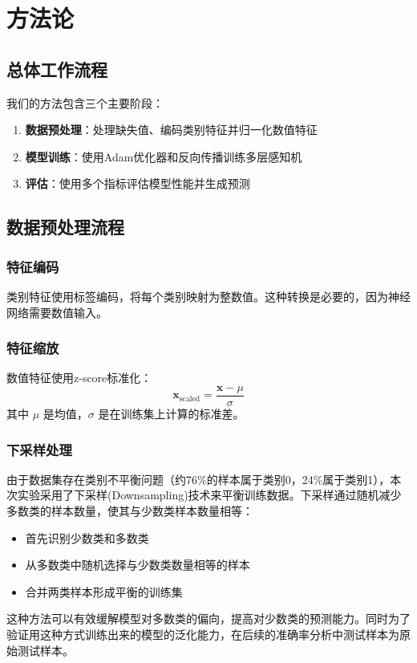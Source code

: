 \documentclass[conference]{IEEEtran}
\begin{document}
\section{方法论}

\subsection{总体工作流程}
我们的方法包含三个主要阶段：
\begin{enumerate}
    \item \textbf{数据预处理}：处理缺失值、编码类别特征并归一化数值特征
    \item \textbf{模型训练}：使用Adam优化器和反向传播训练多层感知机
    \item \textbf{评估}：使用多个指标评估模型性能并生成预测
\end{enumerate}

\subsection{数据预处理流程}

\subsubsection{特征编码}
类别特征使用标签编码，将每个类别映射为整数值。这种转换是必要的，因为神经网络需要数值输入。

\subsubsection{特征缩放}
数值特征使用z-score标准化：
\begin{equation}
\mathbf{x}_{\text{scaled}} = \frac{\mathbf{x} - \mu}{\sigma}
\end{equation}
其中 $\mu$ 是均值，$\sigma$ 是在训练集上计算的标准差。

\subsubsection{下采样处理}
由于数据集存在类别不平衡问题（约76\%的样本属于类别0，24\%属于类别1），本次实验采用了下采样(Downsampling)技术来平衡训练数据。下采样通过随机减少多数类的样本数量，使其与少数类样本数量相等：
\begin{itemize}
    \item 首先识别少数类和多数类
    \item 从多数类中随机选择与少数类数量相等的样本
    \item 合并两类样本形成平衡的训练集
\end{itemize}
这种方法可以有效缓解模型对多数类的偏向，提高对少数类的预测能力。同时为了验证用这种方式训练出来的模型的泛化能力，在后续的准确率分析中测试样本为原始测试样本。
\end{document}
